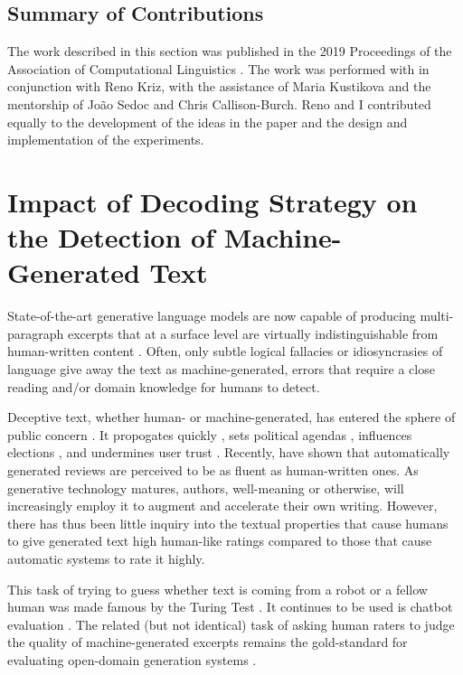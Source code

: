 \subsection{Summary of Contributions}
The work described in this section was published in the 2019 Proceedings of the Association of Computational Linguistics \citep{ippolito2019comparison}.
The work was performed with in conjunction with Reno Kriz, with the assistance of Maria Kustikova and the mentorship of Jo{\~a}o Sedoc and Chris Callison-Burch.
Reno and I contributed equally to the development of the ideas in the paper and the design and implementation of the experiments.
\fi

\section{Impact of Decoding Strategy on the Detection of Machine-Generated Text}
\label{section:detection}


State-of-the-art generative language models are now capable of producing multi-paragraph excerpts that at a surface level are virtually indistinguishable from human-written content \citep{zellers2019defending,radford2019language,adelani2020generating}.
Often, only subtle logical fallacies or idiosyncrasies of language give away the text as machine-generated, errors that require a close reading and/or domain knowledge for humans to detect.

Deceptive text, whether human- or machine-generated, has entered the sphere of public concern \citep{cooke2018fake}.
It propogates quickly \citep{vosoughi2018spread}, sets political agendas \citep{vargo2018agenda}, influences elections \citep{allcott2017social}, and undermines user trust \cite{wang2012serf, song2015crowdtarget}.
Recently, \citet{adelani2020generating} have shown that automatically generated reviews are perceived to be as fluent as human-written ones.
As generative technology matures, authors, well-meaning or otherwise, will increasingly employ it to augment and accelerate their own writing.
However, there has thus been little inquiry into the textual properties that cause humans to give generated text high human-like ratings compared to those that cause automatic systems to rate it highly.

This task of trying to guess whether text is coming from a robot or a fellow human was made famous by the Turing Test \citep{turing1950computing}.
It continues to be used is chatbot evaluation \citep{lowe2017towards}.
The related (but not identical) task of asking human raters to judge the quality of machine-generated excerpts remains the gold-standard for evaluating open-domain generation systems \citep{van2019best}.

